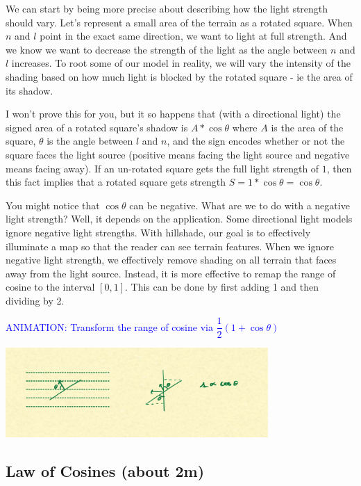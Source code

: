 \documentclass{article}
\newcommand\animation[1]{\textcolor{blue}{ANIMATION: #1}}
\begin{document}
We can start by being more precise about describing how the light strength should vary.
Let's represent a small area of the terrain as a rotated square.
When $n$ and $l$ point in the exact same direction, we want to light at full strength.
And we know we want to decrease the strength of the light as the angle between $n$ and $l$ increases.
To root some of our model in reality, we will vary the intensity of the shading based on how much light is blocked by the rotated square - ie the area of its shadow.

I won't prove this for you, but it so happens that (with a directional light) the signed area of a rotated square's shadow is $A * \cos \theta$ where $A$ is the area of the square, $\theta$ is the angle between $l$ and $n$, and the sign encodes whether or not the square faces the light source (positive means facing the light source and negative means facing away).
If an un-rotated square gets the full light strength of $1$, then this fact implies that a rotated square gets strength $S = 1 * \cos \theta = \cos \theta$.

You might notice that $\cos \theta$ can be negative.
What are we to do with a negative light strength?
Well, it depends on the application.
Some directional light models ignore negative light strengths.
With hillshade, our goal is to effectively illuminate a map so that the reader can see terrain features.
When we ignore negative light strength, we effectively remove shading on all terrain that faces away from the light source.
Instead, it is more effective to remap the range of cosine to the interval $[0, 1]$.
This can be done by first adding 1 and then dividing by 2.
 
\animation{Transform the range of cosine via $\dfrac{1}{2}(1 + \cos \theta)$}

\begin{center}
	\includegraphics[width=0.75\textwidth,frame]{assets/cosine.jpg}
\end{center}

\subsection{Law of Cosines (about 2m)}
\end{document}
